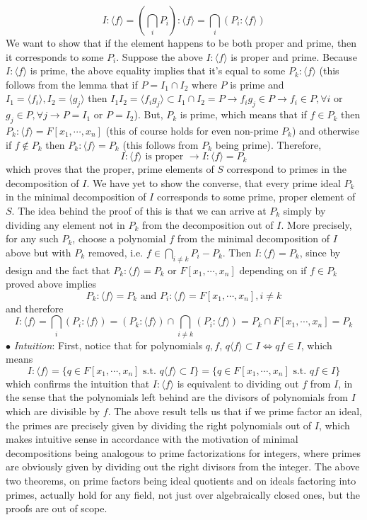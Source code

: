 \documentclass{article}
\newcommand*{\n}{\newline}
\newcommand*{\nn}{\newline \newline}
\newcommand*{\In}{\indent \ensuremath{\bullet} \textit{Intuition}: }
\newcommand*{\Fx}{\ensuremath{F[x_1, \cdots, x_n]}}
\begin{document}
$$ I : \langle f \rangle = \left( \bigcap_i P_i \right) : \langle f \rangle = \bigcap_i (P_i : \langle f \rangle) $$
We want to show that if the element happens to be both proper and prime, then it corresponds to some $ P_i $. Suppose the above $ I : \langle f \rangle $ is proper and prime. Because $ I : \langle f \rangle $ is prime, the above equality implies that it's equal to some $ P_k : \langle f \rangle $ (this follows from the lemma that if $ P = I_1 \cap I_2 $ where $ P $ is prime and $ I_1 = \langle f_i \rangle, I_2 = \langle g_j \rangle $ then $ I_1 I_2 = \langle f_i g_j \rangle \subset I_1 \cap I_2 = P \rightarrow f_i g_j \in P \rightarrow f_i \in P, \forall i $ or $ g_j \in P, \forall j \rightarrow P = I_1 $ or $ P = I_2 $). But, $ P_k $ is prime, which means that if $ f \in P_k $ then $ P_k : \langle f \rangle = \Fx $ (this of course holds for even non-prime $ P_k $) and otherwise if $ f \notin P_k $ then $ P_k : \langle f \rangle = P_k $ (this follows from $ P_k $ being prime). Therefore,
$$ I : \langle f \rangle \text{ is proper } \rightarrow I : \langle f \rangle = P_k $$
which proves that the proper, prime elements of $ S $ correspond to primes in the decomposition of $ I $. 
\n
We have yet to show the converse, that every prime ideal $ P_k $ in the minimal decomposition of $ I $ corresponds to some prime, proper element of $ S $. The idea behind the proof of this is that we can arrive at $ P_k $ simply by dividing any element not in $ P_k $ from the decomposition out of $ I $. More precisely, for any such $ P_k $, choose a polynomial $ f $ from the minimal decomposition of $ I $ above but with $ P_k $ removed, i.e. $ f \in \bigcap_{i \neq k} P_i - P_k $. Then $ I : \langle f \rangle = P_k $, since by design and the fact that $ P_k : \langle f \rangle = P_k \text{ or } \Fx $ depending on if $ f \in P_k $ proved above implies
$$ P_k : \langle f \rangle = P_k \text{ and } P_i : \langle f \rangle = \Fx, i \neq k $$
and therefore
$$ I : \langle f \rangle = \bigcap_i (P_i : \langle f \rangle) = (P_k : \langle f \rangle) \cap \bigcap_{i \neq k} (P_i : \langle f \rangle) = P_k \cap \Fx = P_k $$
\qedsymbol
\n
\In First, notice that for polynomials $ q, f $, $ q \langle f \rangle \subset I \iff q f \in I $, which means
$$ I : \langle f \rangle = \{ q \in \Fx \text{ s.t. } q \langle f \rangle \subset I \} = \{ q \in \Fx \text{ s.t. } q f \in I \} $$
which confirms the intuition that $ I : \langle f \rangle $ is equivalent to dividing out $ f $ from $ I $, in the sense that the polynomials left behind are the divisors of polynomials from $ I $ which are divisible by $ f $. 
\n
The above result tells us that if we prime factor an ideal, the primes are precisely given by dividing the right polynomials out of $ I $, which makes intuitive sense in accordance with the motivation of minimal decompositions being analogous to prime factorizations for integers, where primes are obviously given by dividing out the right divisors from the integer.
\nn
The above two theorems, on prime factors being ideal quotients and on ideals factoring into primes, actually hold for any field, not just over algebraically closed ones, but the proofs are out of scope.
\end{document}
